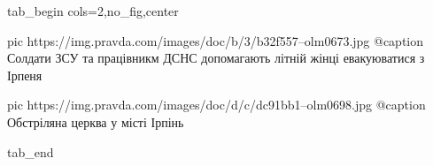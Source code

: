  
 
 
 
 


\ifcmt
  tab_begin cols=2,no_fig,center

     pic https://img.pravda.com/images/doc/b/3/b32f557--olm0673.jpg
		 @caption Солдати ЗСУ та працівникм ДСНС допомагають літній жінці евакуюватися з Ірпеня

		 pic https://img.pravda.com/images/doc/d/c/dc91bb1--olm0698.jpg
		 @caption Обстріляна церква у місті Ірпінь

  tab_end
\fi
